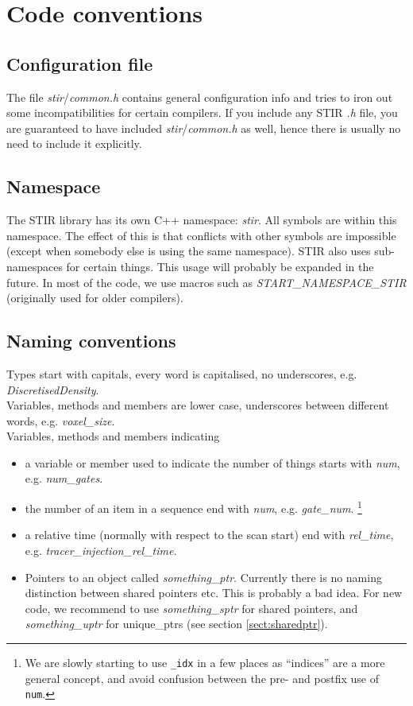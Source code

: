 \documentclass{article}
\begin{document}
\section{
Code conventions}


\subsection{
Configuration file}

The file \textit{stir}/\textit{common.h} contains general configuration 
info and tries to iron out some incompatibilities for certain 
compilers. If you include any STIR \textit{.h} file, you are guaranteed 
to have included \textit{stir}/\textit{common.h} as well, hence there is usually no need
to include it explicitly.

\subsection{
Namespace}

The STIR library has its own C++ namespace: \textit{stir}. All symbols 
are within this namespace. The effect of this is that conflicts 
with other symbols are impossible (except when somebody else 
is using the same namespace). STIR also uses sub-namespaces for 
certain things. This usage will probably be expanded in the future.
In most of the code, we use macros such as \textit{START\_NAMESPACE\_STIR}
(originally used for older compilers).

\subsection{
Naming conventions }

Types start with capitals, every word is capitalised, no underscores, 
e.g. \textit{DiscretisedDensity}.\\
Variables, methods and members are lower case, underscores between 
different words, e.g. \textit{voxel\_size}.\\
Variables, methods and members indicating 
\begin{itemize}
\item 
a variable or member used to indicate the number of things starts 
with \textit{num}, e.g. \textit{num\_gates}.
\item 
the number of an item in a sequence end with \textit{num}, e.g. \textit{gate\_num}.
\footnote{We are slowly starting to use \texttt{\_idx} in a few places as ``indices'' are a more general concept, and avoid confusion between the pre- and postfix use of \texttt{num}.}
\item 
a relative time (normally with respect to the scan start) end 
with \textit{rel\_time}, e.g. \textit{tracer\_injection\_rel\_time}.
\item 
Pointers to an object called \textit{something\_ptr}. Currently there 
is no naming distinction between shared pointers etc. This is 
probably a bad idea. For new code, we recommend to use \textit{something\_sptr} 
for shared pointers, and \textit{something\_uptr} for unique\_ptrs (see 
section \ref{sect:sharedptr}).
\end{itemize}
\end{document}
